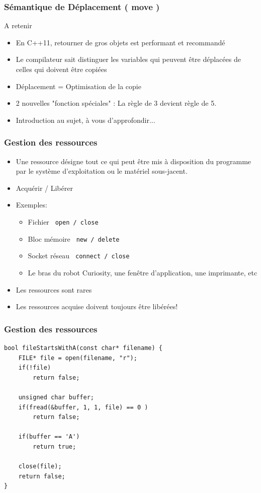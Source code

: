 \documentclass[xetex,mathserif]{beamer}
\begin{document}
\begin{frame}[fragile]
\frametitle{Sémantique de Déplacement ( move )}
A retenir

\begin{itemize} 
	\item En C++11, retourner de gros objets est performant et recommandé
	\item Le compilateur sait distinguer les variables qui peuvent être déplacées de celles qui doivent être copiées
	\item Déplacement = Optimisation de la copie
	\item 2 nouvelles "fonction spéciales" : La règle de 3 devient règle de 5.
	\item Introduction au sujet, à vous d'approfondir...
		
\end{itemize}
\end{frame}



\begin{frame}[fragile]
\frametitle{Gestion des ressources}
\begin{itemize}
	\pause
	\item Une ressource désigne tout ce qui peut être mis à disposition du programme par le système d'exploitation ou le matériel sous-jacent.
	\pause
	\item Acquérir / Libérer
	\pause
	\item Exemples:
	\begin{itemize}
		\item Fichier  \lstinline{ open / close }
		\item Bloc mémoire  \lstinline{ new / delete }
		\item Socket réseau \lstinline{ connect / close }
		\item Le bras du robot Curiosity, une fenêtre d'application, une imprimante, etc
	\end{itemize}
	\pause
	\item Les ressources sont rares	
	\pause 
	\item \large Les ressources acquise doivent toujours être libérées!	 
\end{itemize}
\end{frame}


\begin{frame}[fragile]
\frametitle{Gestion des ressources}
\begin{lstlisting}[style=badcode] 
bool fileStartsWithA(const char* filename) {
    FILE* file = open(filename, "r");
    if(!file)
    	return false;

    unsigned char buffer;
    if(fread(&buffer, 1, 1, file) == 0 )
    	return false;

    if(buffer == 'A')
        return true;
        
    close(file); 
    return false;
}
\end{lstlisting}
\end{frame}
\end{document}

